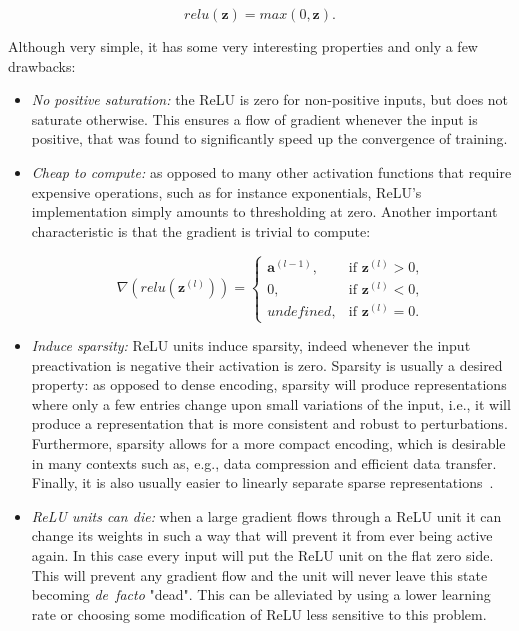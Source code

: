 \begin{equation}\label{eq:relu}
    relu(\mathbf{z}) = max(0, \mathbf{z}).
\end{equation}

Although very simple, it has some very interesting properties and only a few
drawbacks:

\begin{itemize}
    \item \emph{No positive saturation:} the ReLU is zero for non-positive
        inputs, but does not saturate otherwise. This ensures a flow of
        gradient whenever the input is positive, that was found to
        significantly speed up the convergence of training.
    \item \emph{Cheap to compute:} as opposed to many other activation
        functions that require expensive operations, such as for instance
        exponentials, ReLU's implementation simply amounts to thresholding at
        zero. Another important characteristic is that the gradient is trivial
        to compute:

        \begin{equation}\label{eq:relu_derivative}
            \nabla (relu(\mathbf{z}^{(l)})) =
                \begin{cases}
                    \mathbf{a}^{(l-1)},  & \text{if } \mathbf{z}^{(l)} > 0 ,\\
                    0,          & \text{if } \mathbf{z}^{(l)} < 0 ,\\
                    undefined,  & \text{if } \mathbf{z}^{(l)} = 0.
                \end{cases}
        \end{equation}

    \item \emph{Induce sparsity:} ReLU units induce sparsity, indeed whenever
        the input preactivation is negative their activation is zero. Sparsity
        is usually a desired property: as opposed to dense encoding, sparsity
        will produce representations where only a few entries change upon small
        variations of the input, i.e., it will produce a representation that is
        more consistent and robust to perturbations. Furthermore, sparsity
        allows for a more compact encoding, which is desirable in many contexts
        such as, e.g., data compression and efficient data transfer.  Finally,
        it is also usually easier to linearly separate sparse
        representations~\citep{Glorot+al-AI-2011-small}.
    \item \emph{ReLU units can die:} when a large gradient flows through a ReLU
        unit it can change its weights in such a way that will prevent it from
        ever being active again. In this case every input will put the ReLU
        unit on the flat zero side. This will prevent any gradient flow and the
        unit will never leave this state becoming \emph{de~facto} "dead". This
        can be alleviated by using a lower learning rate or choosing some
        modification of ReLU less sensitive to this problem.
\end{itemize}

